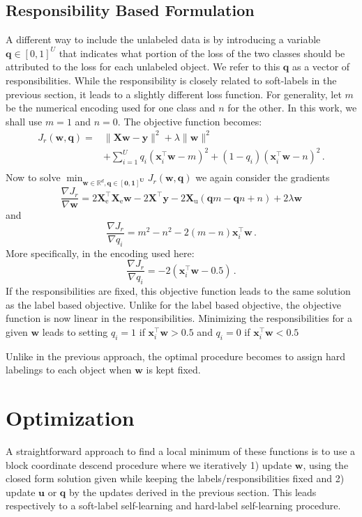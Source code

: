 \documentclass[conference,a4paper,10pt]{IEEEtran}\usepackage[]{graphicx}\usepackage[]{color}
\begin{document}
\subsection{Responsibility Based Formulation}
A different way to include the unlabeled data is by introducing a variable $\mathbf{q} \in [0,1]^U$ that indicates what portion of the loss of the two classes should be attributed to the loss for each unlabeled object. We refer to this $\mathbf{q}$ as a vector of responsibilities. While the responsibility is closely related to soft-labels in the previous section, it leads to a slightly different loss function. For generality, let $m$ be the numerical encoding used for one class and $n$ for the other. In this work, we shall use $m=1$ and $n=0$. The objective function becomes:
\begin{align}
J_r(\mathbf{w},\mathbf{q}) = & \| \mathbf{X} \mathbf{w}-\mathbf{y} \|^2 + \lambda \|\mathbf{w} \|^2 \nonumber \\
& + \sum_{i=1}^{U}  q_i (\mathbf{x}_i^\top \mathbf{w} - m)^2  + (1-q_i) (\mathbf{x}_i^\top \mathbf{w} - n)^2 \,. \nonumber \\ \nonumber
\end{align}
Now to solve $\min_{\mathbf{w} \in \mathbb{R}^d, \mathbf{\mathbf{q} \in [0,1]^U}} J_r(\mathbf{w},\mathbf{q})$ we again consider the gradients
$$
\frac{\nabla J_r}{\nabla \mathbf{w}} = 2 \mathbf{X}^\top_\text{e} \mathbf{X}_\text{e} \mathbf{w} - 2 \mathbf{X}^\top \mathbf{y}  - 2 \mathbf{X}_\text{u} (\mathbf{q} m - \mathbf{q} n + n ) + 2 \lambda \mathbf{w}
$$
and
$$
\frac{\nabla J_r}{\nabla q_i} = m^2 - n^2 - 2 (m-n) \mathbf{x}_i^\top \mathbf{w} \,.
$$
More specifically, in the encoding used here:
$$
\frac{\nabla J_r}{\nabla q_i} = - 2 (\mathbf{x}_i^\top \mathbf{w}-0.5) \,.
$$
If the responsibilities are fixed, this objective function leads to the same solution as the label based objective. Unlike for the label based objective, the objective function is now linear in the responsibilities. Minimizing the responsibilities for a given $\mathbf{w}$ leads to setting $q_i=1$ if  $\mathbf{x}_i^\top \mathbf{w}>0.5$ and $q_i=0$ if $\mathbf{x}_i^\top \mathbf{w}<0.5$

Unlike in the previous approach, the optimal procedure becomes to assign hard labelings to each object when $\mathbf{w}$ is kept fixed.

\section{Optimization}
A straightforward approach to find a local minimum of these functions is to use a block coordinate descend procedure where we iteratively 1) update $\mathbf{w}$, using the closed form solution given while keeping the labels/responsibilities fixed and 2) update $\mathbf{u}$ or $\mathbf{q}$ by the updates derived in the previous section. This leads respectively to a soft-label self-learning and hard-label self-learning procedure.
\end{document}
